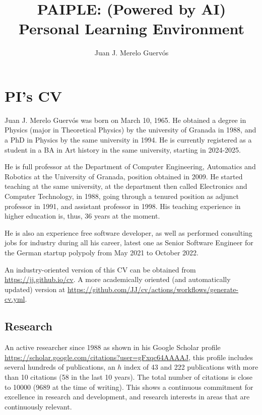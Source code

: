 \documentclass[a4paper]{article}
\title{PAIPLE: (Powered by AI) Personal Learning Environment}
\author{Juan J. Merelo Guervós}
\date{}
\begin{document}
\maketitle

\section{PI's CV}

Juan J. Merelo Guervós was born on March 10, 1965. He obtained a degree in Physics (major in Theoretical Physics) by the university of Granada in 1988, and a PhD in Physics by the same university in 1994. He is currently registered as a student in a BA in Art history in the same university, starting in 2024-2025.

He is full professor at the Department of Computer Engineering, Automatics and Robotics at the University of Granada, position obtained in 2009. He started teaching at the same university, at the department then called Electronics and Computer Technology, in 1988, going through a tenured position as adjunct professor in 1991, and assistant professor in 1998. His teaching experience in higher education is, thus, 36 years at the moment.

He is also an experience free software developer, as well as performed consulting jobs for industry during all his career, latest one as Senior Software Engineer for the German startup polypoly from May 2021 to October 2022.

An industry-oriented version of this CV can be obtained from \url{https://jj.github.io/cv}. A more academically oriented (and automatically updated) version at \url{https://github.com/JJ/cv/actions/workflows/generate-cv.yml}.

\subsection{Research}

An active researcher since 1988 as shown in his Google Scholar profile \url{https://scholar.google.com/citations?user=gFxqc64AAAAJ}, this profile includes several hundreds of publications, an $h$ index of 43 and 222 publications with more than 10 citations (58 in the last 10 years). The total number of citations is close to 10000 (9689 at the time of writing). This shows a continuous commitment for excellence in research and development, and research interests in areas that are continuously relevant.
\end{document}
